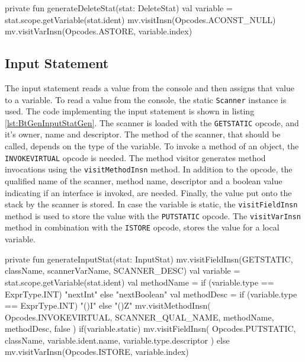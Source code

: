 \begin{KotlinCode}[float,numbers=none,caption=Implementation of the \texttt{generateDeleteStat} method of the \texttt{StatGenerator}., label=lst:BtGenDeleteStatGen]
private fun generateDeleteStat(stat: DeleteStat) {
    val variable = stat.scope.getVariable(stat.ident)
    mv.visitInsn(Opcodes.ACONST_NULL)
    mv.visitVarInsn(Opcodes.ASTORE, variable.index)
}
\end{KotlinCode}

\subsection{Input Statement}

The input statement reads a value from the console and then assigns that value to a variable. To read a value from the console, the static \verb|Scanner| instance is used. The code implementing the input statement is shown in listing \ref{lst:BtGenInputStatGen}. The scanner is loaded with the \verb|GETSTATIC| opcode, and it's owner, name and descriptor. The method of the scanner, that should be called, depends on the type of the variable. To invoke a method of an object, the \verb|INVOKEVIRTUAL| opcode is needed. The method visitor generates method invocations using the \verb|visitMethodInsn| method. In addition to the opcode, the qualified name of the scanner, method name, descriptor and a boolean value indicating if an interface is invoked, are needed. Finally, the value put onto the stack by the scanner is stored. In case the variable is static, the \verb|visitFieldInsn| method is used to store the value with the \verb|PUTSTATIC| opcode. The \verb|visitVarInsn| method in combination with the \verb|ISTORE| opcode, stores the value for a local variable. 


\begin{KotlinCode}[float,numbers=none,caption=Implementation of the \texttt{generateInputStat} method of the \texttt{StatGenerator}., label=lst:BtGenInputStatGen]
private fun generateInputStat(stat: InputStat) {
    mv.visitFieldInsn(GETSTATIC, className, scannerVarName, SCANNER_DESC)
    val variable = stat.scope.getVariable(stat.ident)
    val methodName = if (variable.type == ExprType.INT) "nextInt" else "nextBoolean"
    val methodDesc = if (variable.type == ExprType.INT) "()I" else "()Z"
    mv.visitMethodInsn(
        Opcodes.INVOKEVIRTUAL,
        SCANNER_QUAL_NAME,
        methodName,
        methodDesc,
        false
    )
    if(variable.static) {
        mv.visitFieldInsn(
            Opcodes.PUTSTATIC,
            className,
            variable.ident.name,
            variable.type.descriptor
        )
    } else {
        mv.visitVarInsn(Opcodes.ISTORE, variable.index)
    }
}
\end{KotlinCode}

